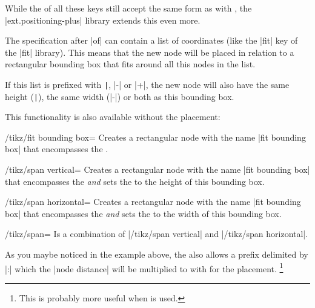While the  of all these keys still accept the same form as with \tikzname,
the |ext.positioning-plus| library extends this even more.

The specification after |of| can contain a list of coordinates
(like the |fit| key of the |fit| library).
This means that the new node will be placed in relation to a rectangular bounding box
that fits around all this nodes in the list.

If this list is prefixed with \verb!|!, |-| or |+|,
the new node will also have the same height (\verb!|!),
the same width (|-|) or both as this bounding box.

\begin{codeexample}[preamble=\usetikzlibrary{ext.positioning-plus}]
\end{codeexample}

This functionality is also available without the placement:
\begin{stylekey}{/tikz/fit bounding box=}
  Creates a rectangular node with the name |fit bounding box| that encompasses
  the .
\end{stylekey}
\begin{stylekey}{/tikz/span vertical=}
  Creates a rectangular node with the name |fit bounding box| that encompasses
  the  \emph{and} sets the  to
  the height of this bounding box.
\end{stylekey}
\begin{stylekey}{/tikz/span horizontal=}
  Creates a rectangular node with the name |fit bounding box| that encompasses
  the  \emph{and} sets the  to
  the width of this bounding box.
\end{stylekey}
\begin{stylekey}{/tikz/span=}
  Is a combination of |/tikz/span vertical| and |/tikz/span horizontal|.
\end{stylekey}

As you maybe noticed in the example above, the  also allows a prefix
delimited by |:| which the |node distance| will be multiplied to with for the placement.%
\footnote{This is probably more useful when  is used.}

\endinput